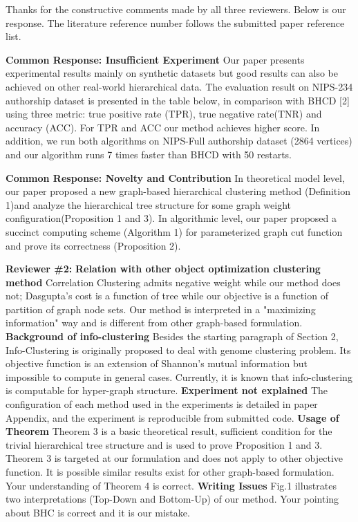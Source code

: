 \documentclass{article}
\begin{document}
Thanks for the constructive comments made by all three reviewers.
Below is our response. The literature reference number follows the submitted paper reference list. 

\textbf{Common Response: Insufficient Experiment}
Our paper presents experimental results mainly on synthetic datasets but good results can also be achieved on other real-world hierarchical data. The evaluation result on NIPS-234 authorship dataset is presented in the table below, in comparison with BHCD [2] using three metric: true positive rate (TPR), true negative rate(TNR) and accuracy (ACC). For TPR and ACC our method achieves higher score. In addition, we run both algorithms on NIPS-Full authorship dataset (2864 vertices) and our algorithm runs 7 times faster than BHCD with 50 restarts.

{\centering
{}\par
}

\textbf{Common Response: Novelty and Contribution}
In theoretical model level, our paper proposed a new graph-based hierarchical clustering method (Definition 1)and analyze the hierarchical tree structure for some graph weight configuration(Proposition 1 and 3). In algorithmic level, our paper proposed a  succinct computing scheme (Algorithm 1) for parameterized graph cut function and prove its correctness (Proposition 2).

\textbf{Reviewer \#2:}
\textbf{Relation with other object optimization clustering method}
Correlation Clustering admits negative weight while our method does not; Dasgupta's cost is a function of tree while our objective is a function of partition of graph node sets. Our method is interpreted in a "maximizing information" way and is different from other graph-based formulation.
\textbf{Background of info-clustering} Besides the starting paragraph of Section 2, Info-Clustering is originally proposed to deal with genome clustering problem. Its objective function is an extension of Shannon's mutual information but impossible to compute in general cases. Currently, it is known that info-clustering is computable for hyper-graph structure.
\textbf{Experiment not explained} The configuration of each method used in the experiments is detailed in paper Appendix, and the experiment is reproducible from submitted code.
\textbf{Usage of Theorem} Theorem 3 is a basic theoretical result, sufficient condition for the trivial hierarchical tree structure and is used to prove Proposition 1 and 3. Theorem 3 is targeted at our formulation and does not apply to other objective function. It is possible similar results exist for other graph-based formulation. Your understanding of Theorem 4 is correct.
\textbf{Writing Issues} Fig.1 illustrates two interpretations (Top-Down and Bottom-Up) of our method. Your pointing about BHC is correct and it is our mistake.
\end{document}
